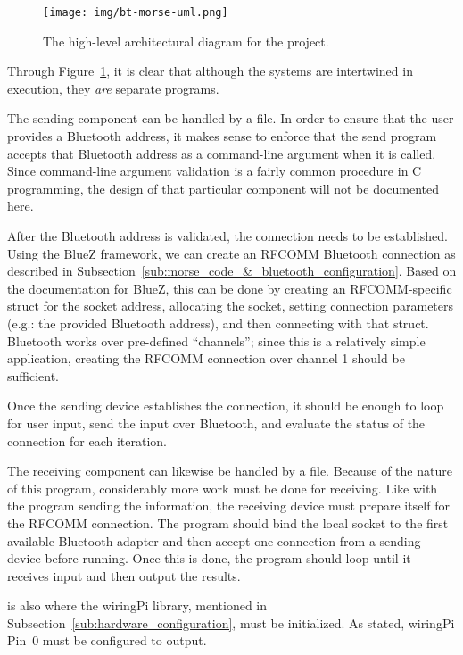 \documentclass[11pt]{article}
\begin{document}
\begin{figure}[ht]
    \centering
    \texttt{[image: img/bt-morse-uml.png]}
    \caption{The high-level architectural diagram for the project.}
    \label{fig:bt-morse-uml}
\end{figure}


Through Figure~\ref{fig:bt-morse-uml}, it is clear that although the systems are intertwined in execution, they \emph{are} separate programs.


The sending component can be handled by a  file.
In order to ensure that the user provides a Bluetooth address, it makes sense to enforce that the send program accepts that Bluetooth address as a command-line argument when it is called.
Since command-line argument validation is a fairly common procedure in C programming, the design of that particular component will not be documented here.


After the Bluetooth address is validated, the connection needs to be established.
Using the BlueZ framework, we can create an RFCOMM Bluetooth connection as described in Subsection~\ref{sub:morse_code_&_bluetooth_configuration}.
Based on the documentation for BlueZ, this can be done by creating an RFCOMM-specific struct for the socket address, allocating the socket, setting connection parameters (e.g.: the provided Bluetooth address), and then connecting with that struct.
Bluetooth works over pre-defined ``channels''; since this is a relatively simple application, creating the RFCOMM connection over channel 1 should be sufficient.


Once the sending device establishes the connection, it should be enough to loop for user input, send the input over Bluetooth, and evaluate the status of the connection for each iteration.


The receiving component can likewise be handled by a  file.
Because of the nature of this program, considerably more work must be done for receiving.
Like with the program sending the information, the receiving device must prepare itself for the RFCOMM connection.
The program should bind the local socket to the first available Bluetooth adapter and then accept one connection from a sending device before running.
Once this is done, the program should loop until it receives input and then output the results.


 is also where the wiringPi library, mentioned in Subsection~\ref{sub:hardware_configuration}, must be initialized.
As stated, wiringPi Pin~0 must be configured to output.
\end{document}
